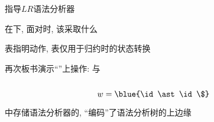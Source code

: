 \begin{frame}{}
  \begin{center}
    指导$LR$语法分析器

    \vspace{0.30cm}

    \vspace{0.10cm}
    在下, 面对时, 该采取什么

    \vspace{0.30cm}
    \purple{\action{}} 表指明动作, \purple{\goto{}} 表仅用于归约时的状态转换
  \end{center}
\end{frame}

\begin{frame}{}
  \begin{center}

    \vspace{0.30cm}
    
  \end{center}
\end{frame}

\begin{frame}{}
  \begin{center}
    再次板书演示``''上操作: 与

    \begin{columns}
        
    \end{columns}

    \[
      w = \blue{\id \ast \id \$}
    \]

    中存储语法分析器的, ``编码''了语法分析树的上边缘
  \end{center}
\end{frame}

\begin{frame}{}
  \begin{center}
    
  \end{center}
\end{frame}

